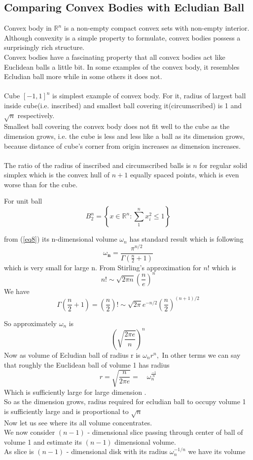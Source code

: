 \documentclass[oneside]{book}
\begin{document}
	\subsection{Comparing Convex Bodies with Ecludian Ball}\label{ss:20}
	Convex body in  $\mathbb{R}^n$  is a non-empty compact convex sets with non-empty interior.\\
	Although convexity is a simple property to formulate, convex bodies possess a surprisingly rich structure.\\
	Convex bodies have a fascinating property that all convex bodies act like Euclidean balls a little bit. In some examples of the convex body, it resembles Ecludian ball more while in some others it does not.\\\\
	Cube $[-1,1]^{n}$ is simplest example of convex body. For it, radius of largest ball inside cube(i.e. inscribed) and smallest ball covering it(circumscribed) is 1 and $\sqrt{n} $ respectively.
	\\
	Smallest ball covering the convex body does not fit well to the cube as the dimension grows, i.e. the cube is less and less like a ball as its dimension grows, because distance of cube's corner from origin increases as dimension increases.\\\\
	The ratio of the radius of inscribed and circumscribed balls is $ n $ for regular solid simplex which is the convex hull of $ n + 1$  equally spaced points,  which is even worse than for the cube.
	
	
	
	
	For unit ball $$B_{2}^{n}=\left\{x \in \mathbb{R}^{n}: \sum_{1}^{n} x_{i}^{2} \leq 1\right\}$$
	
	from (\ref{eq8})
	its n-dimensional volume  $\omega_{{n}}$ has standard result which is following
	\\
	$$\omega_{\mathbf{n} }  =\frac{\pi^{n / 2}}{\Gamma\left(\frac{n}{2}+1\right)} $$
	which is very small for large n. From Stirling's approximation for $ n!$
	which is 
	$$n ! \sim \sqrt{2 \pi n}\left(\frac{n}{e}\right)^{n}$$
	We have 
	$$\Gamma\left(\frac{n}{2}+1\right) = \left(\frac{n}{2}\right)! \sim \sqrt{2 \pi} e^{-n / 2}\left(\frac{n}{2}\right)^{(n+1) / 2}$$
	
	So  approximately $\omega_{n}$ is 
	$$\left(\sqrt{\frac{2 \pi e}{n}}\right)^{n}$$
	Now as volume of Ecludian ball of radius r is $\omega_{n} r^{n}, $
	In other terms we can say that roughly the Euclidean ball of volume 1 has radius 
	\[
	r =  \sqrt{\frac{n}{2 \pi e}}   = \quad \omega_{n}^{\frac{-1}{n}}
	\]
	Which is sufficiently large for large dimension
	. \\
	So as the dimension grows, radius required  for ecludian ball to occupy volume 1 is sufficiently large and is
	proportional to $\sqrt{n}$ \\
	Now let us see where its all volume concentrates.\\
	We now consider $( n - 1 )$ - dimensional slice passing through center of ball of volume 1 and estimate its $( n-1 )$  dimensional volume.\\
	As slice is $(n - 1)$ - dimensional disk with its radius $\omega_{n}^{-1/n}$ we have its volume 
	
\end{document}
